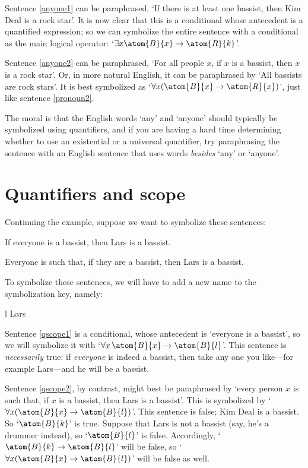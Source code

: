 Sentence \ref{anyone1} can be paraphrased, `If there is at least one bassist, then Kim Deal is a rock star'. It is now clear that this is a conditional whose antecedent is a quantified expression; so we can symbolize the entire sentence with a conditional as the main logical operator: `$\exists x \atom{B}{x} \eif \atom{R}{k}$'.

Sentence \ref{anyone2} can be paraphrased, `For all people $x$, if $x$ is a bassist, then $x$ is a rock star'. Or, in more natural English, it can be paraphrased by `All bassists are rock stars'. It is best symbolized as `$\forall x(\atom{B}{x} \eif \atom{R}{x})$', just like sentence \ref{pronoun2}.

The moral is that the English words `any' and `anyone' should typically be symbolized using quantifiers, and if you are having a hard time determining whether to use an existential or a universal quantifier, try paraphrasing the sentence with an English sentence that uses words \emph{besides} `any' or `anyone'.



\section{Quantifiers and scope}
Continuing the example, suppose we want to symbolize these sentences:
	\begin{earg}
		\item[\ex{qscope1}] If everyone is a bassist, then Lars is a bassist.
		\item[\ex{qscope2}] Everyone is such that, if they are a bassist, then Lars is a bassist.
	\end{earg}
To symbolize these sentences, we will have to add a new name to the symbolization key, namely:
	\begin{ekey}
		\item[l] Lars
	\end{ekey}
Sentence \ref{qscope1} is a conditional, whose antecedent is `everyone is a bassist', so we will symbolize it with `$\forall x\, \atom{B}{x} \eif \atom{B}{l}$'. This sentence is \emph{necessarily} true: if \emph{everyone} is indeed a bassist, then take any one you like---for example Lars---and he will be a bassist.

Sentence \ref{qscope2}, by contrast, might best be paraphrased by `every person $x$ is such that, if $x$ is a bassist, then Lars is a bassist'. This is symbolized by `$\forall x (\atom{B}{x} \eif \atom{B}{l})$'. This sentence is false; Kim Deal is a bassist. So `$\atom{B}{k}$' is true. Suppose that Lars is not a bassist (say, he's a drummer instead), so `$\atom{B}{l}$' is false. Accordingly, `$\atom{B}{k} \eif \atom{B}{l}$' will be false, so `$\forall x (\atom{B}{x} \eif \atom{B}{l})$' will be false as well.

